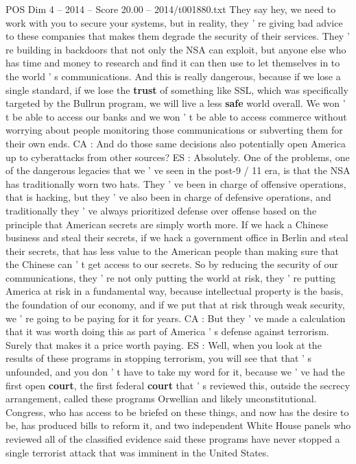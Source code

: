 \begin{textsample}{POS Dim 4 – 2014 – Score 20.00 – 2014/t001880.txt}
They say hey, we need to work with you to secure your systems, but in reality, they ' re giving bad advice to these companies that makes them degrade the security of their services.
They ' re building in backdoors that not only the NSA can exploit, but anyone else who has time and money to research and find it can then use to let themselves in to the world ' s communications.
And this is really dangerous, because if we lose a single standard, if we lose the \textbf{trust} of something like SSL, which was specifically targeted by the Bullrun program, we will live a less \textbf{safe} world overall.
We won ' t be able to access our banks and we won ' t be able to access commerce without worrying about people monitoring those communications or subverting them for their own ends.
CA : And do those same decisions also potentially open America up to cyberattacks from other sources?
ES : Absolutely.
One of the problems, one of the dangerous legacies that we ' ve seen in the post-9 / 11 era, is that the NSA has traditionally worn two hats.
They ' ve been in charge of offensive operations, that is hacking, but they ' ve also been in charge of defensive operations, and traditionally they ' ve always prioritized defense over offense based on the principle that American secrets are simply worth more.
If we hack a Chinese business and steal their secrets, if we hack a government office in Berlin and steal their secrets, that has less value to the American people than making sure that the Chinese can ' t get access to our secrets.
So by reducing the security of our communications, they ' re not only putting the world at risk, they ' re putting America at risk in a fundamental way, because intellectual property is the basis, the foundation of our economy, and if we put that at risk through weak security, we ' re going to be paying for it for years.
CA : But they ' ve made a calculation that it was worth doing this as part of America ' s defense against terrorism.
Surely that makes it a price worth paying.
ES : Well, when you look at the results of these programs in stopping terrorism, you will see that that ' s unfounded, and you don ' t have to take my word for it, because we ' ve had the first open \textbf{court}, the first federal \textbf{court} that ' s reviewed this, outside the secrecy arrangement, called these programs Orwellian and likely unconstitutional.
Congress, who has access to be briefed on these things, and now has the desire to be, has produced bills to reform it, and two independent White House panels who reviewed all of the classified evidence said these programs have never stopped a single terrorist attack that was imminent in the United States.

\end{textsample}
